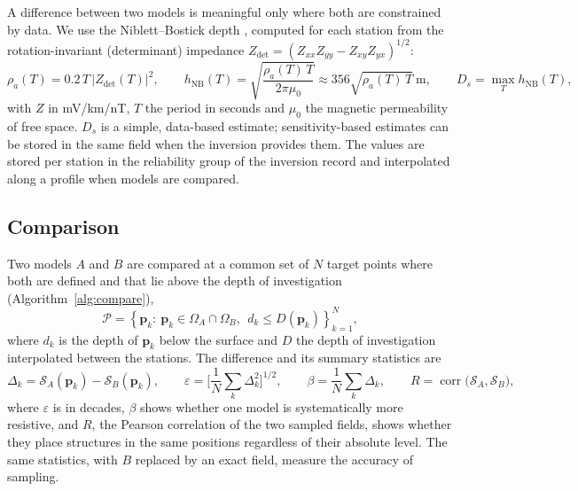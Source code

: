 \documentclass[manuscript]{geophysics}
\begin{document}
A difference between two models is meaningful only where both are
constrained by data. We use the Niblett--Bostick depth
\citep{Jones1983,Spies1989}, computed for each station from the
rotation-invariant (determinant) impedance
$Z_{\det} = (Z_{xx}Z_{yy} - Z_{xy}Z_{yx})^{1/2}$:
\begin{equation}
\rho_a(T) = 0.2\,T\,\lvert Z_{\det}(T)\rvert^{2},
\qquad
h_{\mathrm{NB}}(T) = \sqrt{\frac{\rho_a(T)\,T}{2\pi\mu_0}} \approx 356\sqrt{\rho_a(T)\,T}\ \mathrm{m},
\qquad
D_s = \max_T h_{\mathrm{NB}}(T),
\label{eq:doi}
\end{equation}
with $Z$ in mV/km/nT, $T$ the period in seconds and $\mu_0$ the
magnetic permeability of free space. $D_s$ is a simple, data-based
estimate; sensitivity-based estimates \citep{Oldenburg1999} can be
stored in the same field when the inversion provides them. The values
are stored per station in the reliability group of the inversion
record and interpolated along a profile when models are compared.

\subsection{Comparison}

Two models $A$ and $B$ are compared at a common set of $N$ target
points where both are defined and that lie above the depth of
investigation (Algorithm~\ref{alg:compare}),
\begin{equation}
\mathcal{P} = \left\{ \mathbf{p}_k :\ \mathbf{p}_k \in \Omega_A \cap
\Omega_B,\ \ d_k \le D(\mathbf{p}_k) \right\}_{k=1}^{N},
\label{eq:targets}
\end{equation}
where $d_k$ is the depth of $\mathbf{p}_k$ below the surface and $D$
the depth of investigation interpolated between the stations. The
difference and its summary statistics are
\begin{equation}
\Delta_k = \mathcal{S}_A(\mathbf{p}_k) - \mathcal{S}_B(\mathbf{p}_k),
\qquad
\varepsilon = \Big[\frac{1}{N}\sum_{k}\Delta_k^{2}\Big]^{1/2},
\qquad
\beta = \frac{1}{N}\sum_{k}\Delta_k,
\qquad
R = \operatorname{corr}\big(\mathcal{S}_A, \mathcal{S}_B\big),
\label{eq:stats}
\end{equation}
where $\varepsilon$ is in decades, $\beta$ shows whether one model is
systematically more resistive, and $R$, the Pearson correlation of the
two sampled fields, shows whether they place structures in the same
positions regardless of their absolute level. The same statistics,
with $B$ replaced by an exact field, measure the accuracy of sampling.
\end{document}
